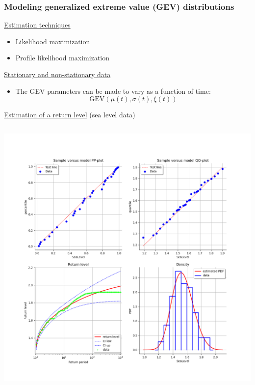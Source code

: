 \documentclass[aspectratio=169]{beamer}
\begin{document}
\begin{frame}[containsverbatim]
\frametitle{Modeling generalized extreme value (GEV) distributions}

\scriptsize

  \begin{minipage}[t]{0.5\textwidth}



\underline{Estimation techniques}
\begin{itemize}
\item Likelihood maximization
\item Profile likelihood maximization
\end{itemize}

\end{minipage}%
  \begin{minipage}[t]{0.5\textwidth}


\underline{Stationary and non-stationary data}
\begin{itemize}
\item The GEV parameters can be made to vary as a function of time:
\begin{equation*}
\mbox{GEV} (\mu(t), \sigma(t), \xi(t))
\end{equation*}
\end{itemize}

\end{minipage}

\underline{Estimation of a return level} (sea level data)

  \begin{columns}

\centering
    \includegraphics[width=.71\textwidth]{figures/GEV1.png}
    

\end{columns}
\end{frame}
\end{document}
